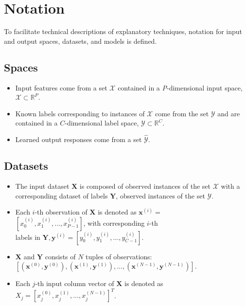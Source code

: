 \documentclass{article}
\begin{document}
\section{Notation} \label{sec:notation}

To facilitate technical descriptions of explanatory techniques, notation for input and output spaces, datasets, and models is defined.

\subsection{Spaces} 
 
	\begin{itemize}
		\item Input features come from a set $\mathcal{X}$ contained in a \textit{P}-dimensional input space, $\mathcal{X} \subset \mathbb{R}^P$.  
		\item Known labels corresponding to instances of $\mathcal{X}$ come from the set $\mathcal{Y}$ and are contained in a $C$-dimensional label space, $\mathcal{Y} \subset \mathbb{R}^C$.
		\item Learned output responses come from a set $\mathcal{\hat{Y}}$. %
	\end{itemize}	
	
\subsection{Datasets} 

	\begin{itemize}
		\item The input dataset $\mathbf{X}$ is composed of observed instances of the set $\mathcal{X}$ with a corresponding dataset of labels $\mathbf{Y}$, observed instances of the set $\mathcal{Y}$.
		\item Each $i$-th observation of $\mathbf{X}$ is denoted as $\mathbf{x}^{(i)} = $ \\ 
		$[x_0^{(i)}, x_1^{(i)}, \dots, x_{\textit{P}-1}^{(i)}]$, with corresponding $i$-th \\ labels in $\mathbf{Y}, \mathbf{y}^{(i)} = [y_0^{(i)}, y_1^{(i)}, \dots, y_{\textit{C}-1}^{(i)}]$.
		\item $\mathbf{X}$ and $\mathbf{Y}$ consists of $N$ tuples of observations:\\ $[(\mathbf{x}^{(0)},\mathbf{y}^{(0)}), (\mathbf{x}^{(1)},\mathbf{y}^{(1)}), \dots, (\mathbf{x}^{(N-1)},\mathbf{y}^{(N-1)})]$. %
		\item Each $j$-th input column vector of $\mathbf{X}$ is denoted as $X_j = [x_{j}^{(0)}, x_{j}^{(1)}, \dots, x_{j}^{(N-1)}]^T$.
	\end{itemize}	 
\end{document}
